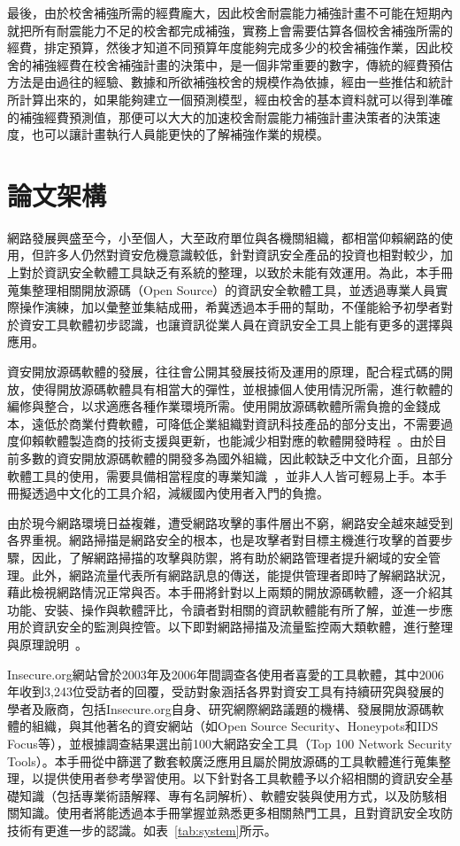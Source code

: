 最後，由於校舍補強所需的經費龐大，因此校舍耐震能力補強計畫不可能在短期內就把所有耐震能力不足的校舍都完成補強，實務上會需要估算各個校舍補強所需的經費，排定預算，然後才知道不同預算年度能夠完成多少的校舍補強作業，因此校舍的補強經費在校舍補強計畫的決策中，是一個非常重要的數字，傳統的經費預估方法是由過往的經驗、數據和所欲補強校舍的規模作為依據，經由一些推估和統計所計算出來的，如果能夠建立一個預測模型，經由校舍的基本資料就可以得到準確的補強經費預測值，那便可以大大的加速校舍耐震能力補強計畫決策者的決策速度，也可以讓計畫執行人員能更快的了解補強作業的規模。

\section{論文架構}


網路發展興盛至今，小至個人，大至政府單位與各機關組織，都相當仰賴網路的使用，但許多人仍然對資安危機意識較低，針對資訊安全產品的投資也相對較少，加上對於資訊安全軟體工具缺乏有系統的整理，以致於未能有效運用。為此，本手冊蒐集整理相關開放源碼（Open Source）的資訊安全軟體工具，並透過專業人員實際操作演練，加以彙整並集結成冊，希冀透過本手冊的幫助，不僅能給予初學者對於資安工具軟體初步認識，也讓資訊從業人員在資訊安全工具上能有更多的選擇與應用。

資安開放源碼軟體的發展，往往會公開其發展技術及運用的原理，配合程式碼的開放，使得開放源碼軟體具有相當大的彈性，並根據個人使用情況所需，進行軟體的編修與整合，以求適應各種作業環境所需。使用開放源碼軟體所需負擔的金錢成本，遠低於商業付費軟體，可降低企業組織對資訊科技產品的部分支出，不需要過度仰賴軟體製造商的技術支援與更新，也能減少相對應的軟體開發時程~\cite{GarofalakisHM07}。由於目前多數的資安開放源碼軟體的開發多為國外組織，因此較缺乏中文化介面，且部分軟體工具的使用，需要具備相當程度的專業知識~\cite{MaddenFHH02}，並非人人皆可輕易上手。本手冊擬透過中文化的工具介紹，減緩國內使用者入門的負擔。

由於現今網路環境日益複雜，遭受網路攻擊的事件層出不窮，網路安全越來越受到各界重視。網路掃描是網路安全的根本，也是攻擊者對目標主機進行攻擊的首要步驟，因此，了解網路掃描的攻擊與防禦，將有助於網路管理者提升網域的安全管理。此外，網路流量代表所有網路訊息的傳送，能提供管理者即時了解網路狀況，藉此檢視網路情況正常與否。本手冊將針對以上兩類的開放源碼軟體，逐一介紹其功能、安裝、操作與軟體評比，令讀者對相關的資訊軟體能有所了解，並進一步應用於資訊安全的監測與控管。以下即對網路掃描及流量監控兩大類軟體，進行整理與原理說明~\cite{KotiVDSD07, SubrPPKG06, ShengLMJ07, Wagner04}。
	
Insecure.org網站曾於2003年及2006年間調查各使用者喜愛的工具軟體，其中2006年收到3,243位受訪者的回覆，受訪對象涵括各界對資安工具有持續研究與發展的學者及廠商，包括Insecure.org自身、研究網際網路議題的機構、發展開放源碼軟體的組織，與其他著名的資安網站（如Open Source Security、Honeypots和IDS Focus等），並根據調查結果選出前100大網路安全工具（Top 100 Network Security Tools）。本手冊從中篩選了數套較廣泛應用且屬於開放源碼的工具軟體進行蒐集整理，以提供使用者參考學習使用。以下針對各工具軟體予以介紹相關的資訊安全基礎知識（包括專業術語解釋、專有名詞解析）、軟體安裝與使用方式，以及防駭相關知識。使用者將能透過本手冊掌握並熟悉更多相關熱門工具，且對資訊安全攻防技術有更進一步的認識。如表~\ref{tab:system}所示。 


